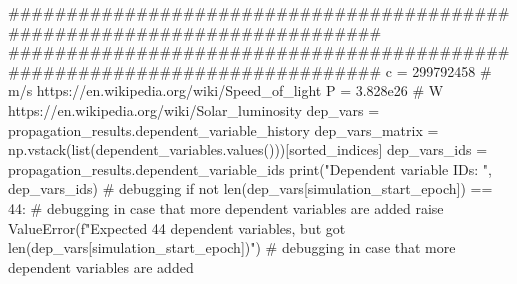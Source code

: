 {}
\markdownRendererSectionEnd \markdownRendererSectionBegin
{}\markdownRendererInterblockSeparator
{}
\markdownRendererSectionEnd \markdownRendererSectionBegin
{}\markdownRendererInterblockSeparator
{}
\markdownRendererSectionEnd \markdownRendererSectionBegin
{}\markdownRendererInterblockSeparator
{}
\markdownRendererSectionEnd \markdownRendererSectionBegin
{}\markdownRendererInterblockSeparator
{}
\markdownRendererSectionEnd \markdownRendererSectionBegin
{}\markdownRendererInterblockSeparator
{}
\markdownRendererSectionEnd \markdownRendererSectionBegin
{}\markdownRendererInterblockSeparator
{}
\markdownRendererSectionEnd \markdownRendererSectionBegin
{}\markdownRendererInterblockSeparator
{}
\markdownRendererSectionEnd \markdownRendererSectionBegin
{}\markdownRendererInterblockSeparator
{}
\markdownRendererSectionEnd \markdownRendererSectionBegin
{}\markdownRendererInterblockSeparator
{}###########################################################################\markdownRendererInterblockSeparator
{}
\markdownRendererSectionEnd \markdownRendererSectionBegin
{}\markdownRendererInterblockSeparator
{}########################################################################### c = 299792458 # m/s https://en.wikipedia.org/wiki/Speed_of_light P = 3.828e26 # W https://en.wikipedia.org/wiki/Solar_luminosity\markdownRendererInterblockSeparator
{}
\markdownRendererSectionEnd \markdownRendererSectionBegin
{}\markdownRendererInterblockSeparator
{}dep_vars = propagation_results.dependent_variable_history dep_vars_matrix = np.vstack(list(dependent_variables.values()))[sorted_indices] dep_vars_ids = propagation_results.dependent_variable_ids print("Dependent variable IDs: ", dep_vars_ids) # debugging if not len(dep_vars[simulation_start_epoch]) == 44: # debugging in case that more dependent variables are added raise ValueError(f"Expected 44 dependent variables, but got {len(dep_vars[simulation_start_epoch])}") # debugging in case that more dependent variables are added\markdownRendererInterblockSeparator
